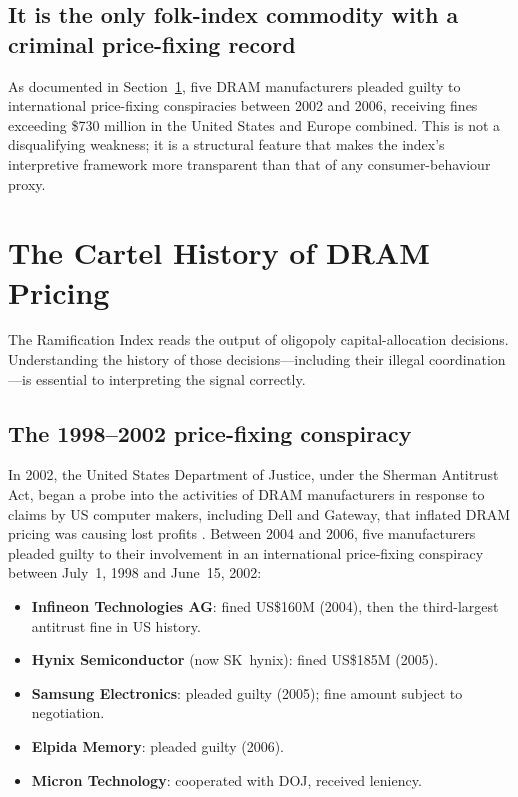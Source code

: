 \documentclass[12pt]{article}
\theoremstyle{definition}
\begin{document}
\subsection{It is the only folk-index commodity with a criminal price-fixing record}

As documented in Section~\ref{sec:cartel}, five DRAM manufacturers pleaded guilty to international price-fixing conspiracies between 2002 and 2006, receiving fines exceeding \$730 million in the United States and Europe combined. This is not a disqualifying weakness; it is a structural feature that makes the index's interpretive framework more transparent than that of any consumer-behaviour proxy.


\section{The Cartel History of DRAM Pricing}
\label{sec:cartel}

The Ramification Index reads the output of oligopoly capital-allocation decisions. Understanding the history of those decisions---including their illegal coordination---is essential to interpreting the signal correctly.

\subsection{The 1998--2002 price-fixing conspiracy}

In 2002, the United States Department of Justice, under the Sherman Antitrust Act, began a probe into the activities of DRAM manufacturers in response to claims by US computer makers, including Dell and Gateway, that inflated DRAM pricing was causing lost profits \cite{DOJ2006}. Between 2004 and 2006, five manufacturers pleaded guilty to their involvement in an international price-fixing conspiracy between July~1, 1998 and June~15, 2002:

\begin{itemize}[itemsep=2pt]
\item \textbf{Infineon Technologies AG}: fined US\$160M (2004), then the third-largest antitrust fine in US history.
\item \textbf{Hynix Semiconductor} (now SK~hynix): fined US\$185M (2005).
\item \textbf{Samsung Electronics}: pleaded guilty (2005); fine amount subject to negotiation.
\item \textbf{Elpida Memory}: pleaded guilty (2006).
\item \textbf{Micron Technology}: cooperated with DOJ, received leniency.
\end{itemize}
\end{document}
